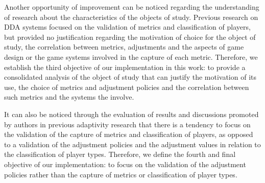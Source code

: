 Another opportunity of improvement can be noticed regarding the understanding of research about the characteristics of the objects of study. Previous research on DDA systems focused on the validation of metrics and classification of players, but provided no justification regarding the motivation of choice for the object of study, the correlation between metrics, adjustments and the aspects of game design or the game systems involved in the capture of each metric. Therefore, we establish the third objective of our implementation in this work: to provide a consolidated analysis of the object of study that can justify the motivation of its use, the choice of metrics and adjustment policies and the correlation between such metrics and the systems the involve.

It can also be noticed through the evaluation of results and discussions promoted by authors in previous adaptivity research that there is a tendency to focus on the validation of the capture of metrics and classification of players, as opposed to a validation of the adjustment policies and the adjustment values in relation to the classification of player types. Therefore, we define the fourth and final objective of our implementation: to focus on the validation of the adjustment policies rather than the capture of metrics or classification of player types.